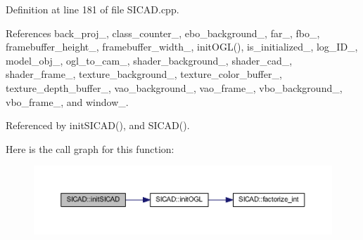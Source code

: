 Definition at line 181 of file S\+I\+C\+A\+D.\+cpp.



References back\+\_\+proj\+\_\+, class\+\_\+counter\+\_\+, ebo\+\_\+background\+\_\+, far\+\_\+, fbo\+\_\+, framebuffer\+\_\+height\+\_\+, framebuffer\+\_\+width\+\_\+, init\+O\+G\+L(), is\+\_\+initialized\+\_\+, log\+\_\+\+I\+D\+\_\+, model\+\_\+obj\+\_\+, ogl\+\_\+to\+\_\+cam\+\_\+, shader\+\_\+background\+\_\+, shader\+\_\+cad\+\_\+, shader\+\_\+frame\+\_\+, texture\+\_\+background\+\_\+, texture\+\_\+color\+\_\+buffer\+\_\+, texture\+\_\+depth\+\_\+buffer\+\_\+, vao\+\_\+background\+\_\+, vao\+\_\+frame\+\_\+, vbo\+\_\+background\+\_\+, vbo\+\_\+frame\+\_\+, and window\+\_\+.



Referenced by init\+S\+I\+C\+A\+D(), and S\+I\+C\+A\+D().

Here is the call graph for this function\+:
\nopagebreak
\begin{figure}[H]
\begin{center}
\leavevmode
\includegraphics[width=350pt]{classSICAD_a04e1291dc1a51b2dee87dbe9a5b3a316_cgraph}
\end{center}
\end{figure}
\mbox{\label{classSICAD_abb2b0250a885435828d5255645e06ac8}} 
